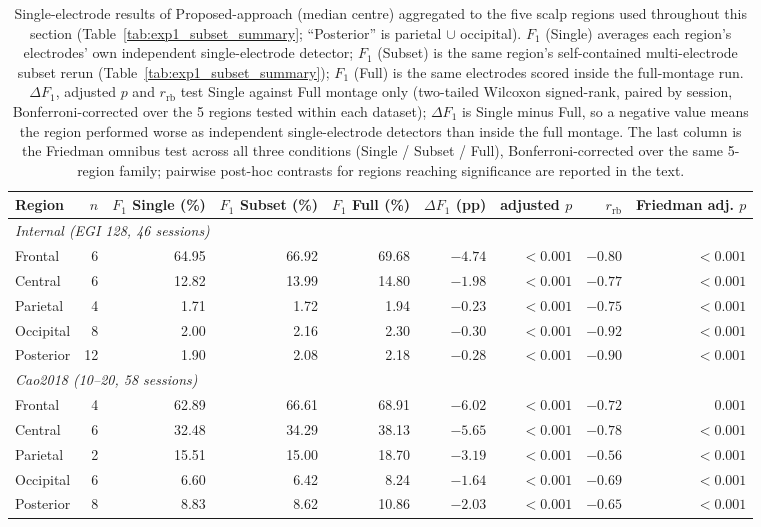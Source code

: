 \begin{table}[htbp]
\centering
\footnotesize
\setlength{\tabcolsep}{4pt}
\caption{Single-electrode results of Proposed-approach (median centre) aggregated to the five scalp regions used throughout this section (Table~\ref{tab:exp1_subset_summary}; ``Posterior'' is parietal $\cup$ occipital). $F_1$ (Single) averages each region's electrodes' own independent single-electrode detector; $F_1$ (Subset) is the same region's self-contained multi-electrode subset rerun (Table~\ref{tab:exp1_subset_summary}); $F_1$ (Full) is the same electrodes scored inside the full-montage run. $\Delta F_1$, adjusted $p$ and $r_{\mathrm{rb}}$ test Single against Full montage only (two-tailed Wilcoxon signed-rank, paired by session, Bonferroni-corrected over the 5 regions tested within each dataset); $\Delta F_1$ is Single minus Full, so a negative value means the region performed worse as independent single-electrode detectors than inside the full montage. The last column is the Friedman omnibus test across all three conditions (Single / Subset / Full), Bonferroni-corrected over the same 5-region family; pairwise post-hoc contrasts for regions reaching significance are reported in the text.}
\label{tab:exp1_single_channel_region}
\begin{tabular}{lrrrrrrrr}
\toprule
Region & $n$ & $F_1$ Single (\%) & $F_1$ Subset (\%) & $F_1$ Full (\%) & $\Delta F_1$ (pp) & adjusted $p$ & $r_{\mathrm{rb}}$ & Friedman adj. $p$ \\
\midrule
\multicolumn{8}{l}{\textit{Internal (EGI 128, 46 sessions)}} \\[2pt]
Frontal & 6 & 64.95 & 66.92 & 69.68 & $-4.74$ & $<0.001$ & $-0.80$ & $<0.001$ \\
Central & 6 & 12.82 & 13.99 & 14.80 & $-1.98$ & $<0.001$ & $-0.77$ & $<0.001$ \\
Parietal & 4 & 1.71 & 1.72 & 1.94 & $-0.23$ & $<0.001$ & $-0.75$ & $<0.001$ \\
Occipital & 8 & 2.00 & 2.16 & 2.30 & $-0.30$ & $<0.001$ & $-0.92$ & $<0.001$ \\
Posterior & 12 & 1.90 & 2.08 & 2.18 & $-0.28$ & $<0.001$ & $-0.90$ & $<0.001$ \\
\midrule
\multicolumn{8}{l}{\textit{Cao2018 (10--20, 58 sessions)}} \\[2pt]
Frontal & 4 & 62.89 & 66.61 & 68.91 & $-6.02$ & $<0.001$ & $-0.72$ & $0.001$ \\
Central & 6 & 32.48 & 34.29 & 38.13 & $-5.65$ & $<0.001$ & $-0.78$ & $<0.001$ \\
Parietal & 2 & 15.51 & 15.00 & 18.70 & $-3.19$ & $<0.001$ & $-0.56$ & $<0.001$ \\
Occipital & 6 & 6.60 & 6.42 & 8.24 & $-1.64$ & $<0.001$ & $-0.69$ & $<0.001$ \\
Posterior & 8 & 8.83 & 8.62 & 10.86 & $-2.03$ & $<0.001$ & $-0.65$ & $<0.001$ \\
\bottomrule
\end{tabular}
\end{table}
